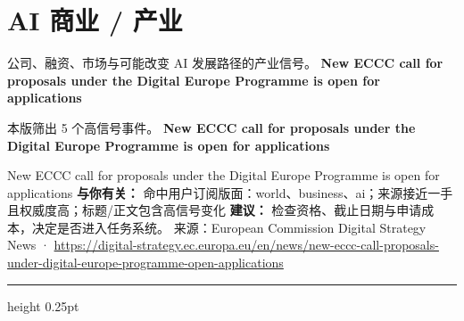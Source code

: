 \documentclass[10.5pt]{ctexart}
\begin{document}
\section*{AI 商业 / 产业}
{\color{ormuted} 公司、融资、市场与可能改变 AI 发展路径的产业信号。}
\vspace{2mm}
{\LARGE\bfseries New ECCC call for proposals under the Digital Europe Programme is open for applications}\par
\vspace{1mm}
{\color{ormuted} 本版筛出 5 个高信号事件。}
\vspace{3mm}
{\Large\bfseries New ECCC call for proposals under the Digital Europe Programme is open for applications}\par
New ECCC call for proposals under the Digital Europe Programme is open for applications
\textbf{与你有关：} 命中用户订阅版面：world、business、ai；来源接近一手且权威度高；标题/正文包含高信号变化
\textbf{建议：} 检查资格、截止日期与申请成本，决定是否进入任务系统。
{\footnotesize\color{ormuted} 来源：European Commission Digital Strategy News · \url{https://digital-strategy.ec.europa.eu/en/news/new-eccc-call-proposals-under-digital-europe-programme-open-applications}}
\vspace{4mm}
\hrule height 0.25pt
\vspace{3mm}
\end{document}
